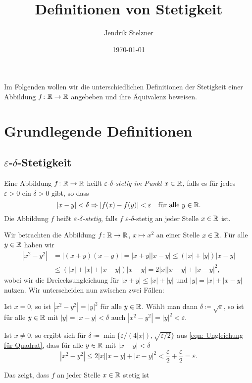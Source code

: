 \documentclass[a4paper,10pt]{article}
\title{Definitionen von Stetigkeit}
\author{Jendrik Stelzner}
\date{\today}
\begin{document}
\maketitle


Im Folgenden wollen wir die unterschiedlichen Definitionen der Stetigkeit einer Abbildung $f \colon \mathbb{R} \to \mathbb{R}$ angebeben und ihre Äquivalenz beweisen.


\tableofcontents





\section{Grundlegende Definitionen}


\subsection{$\varepsilon$-$\delta$-Stetigkeit}


\begin{defi}
 Eine Abbildung $f \colon \mathbb{R} \to \mathbb{R}$ heißt \emph{$\varepsilon$-$\delta$-stetig im Punkt $x \in \mathbb{R}$}, falls es für jedes $\varepsilon > 0$ ein $\delta > 0$ gibt, so dass
 \[
  |x-y| < \delta \Rightarrow |f(x)-f(y)| < \varepsilon \quad \text{für alle $y \in \mathbb{R}$}.
 \]
 Die Abbildung $f$ heißt \emph{$\varepsilon$-$\delta$-stetig}, falls $f$ $\varepsilon$-$\delta$-stetig an jeder Stelle $x \in \mathbb{R}$ ist.
\end{defi}


\begin{bsp}
 Wir betrachten die Abbildung $f \colon \mathbb{R} \to \mathbb{R}$, $x \mapsto x^2$ an einer Stelle $x \in \mathbb{R}$. Für alle $y \in \mathbb{R}$ haben wir
 \begin{equation}\label{eqn: Ungleichung für Quadrat}
  \begin{aligned}
   \left| x^2 - y^2 \right|
   &= |(x+y)(x-y)|
   = |x+y||x-y|
   \leq (|x|+|y|)|x-y| \\
   &\leq (|x|+|x|+|x-y|)|x-y|
   = 2|x||x-y| + |x-y|^2,
  \end{aligned}
 \end{equation}
 wobei wir die Dreiecksungleichung für \mbox{$|x+y| \leq |x| + |y|$} und \mbox{$|y| = |x| + |x-y|$} nutzen. Wir unterscheiden nun zwischen zwei Fällen:
 
 Ist $x = 0$, so ist $|x^2 - y^2| = |y|^2$ für alle $y \in \mathbb{R}$. Wählt man dann $\delta \coloneqq \sqrt{\varepsilon}$, so ist für alle $y \in \mathbb{R}$ mit $|y| = |x-y| < \delta$ auch $|x^2-y^2| = |y|^2 < \varepsilon$.
 
 Ist $x \neq 0$, so ergibt sich für $\delta \coloneqq \min\{ \varepsilon/(4|x|), \sqrt{\varepsilon/2} \}$ aus \eqref{eqn: Ungleichung für Quadrat}, dass für alle $y \in \mathbb{R}$ mit $|x-y| < \delta$
 \[
  \left| x^2 - y^2 \right| \leq 2|x||x-y| + |x-y|^2 < \frac{\varepsilon}{2} + \frac{\varepsilon}{2} = \varepsilon.
 \]
 
 Das zeigt, dass $f$ an jeder Stelle $x \in \mathbb{R}$ stetig ist
\end{bsp}
\end{document}
